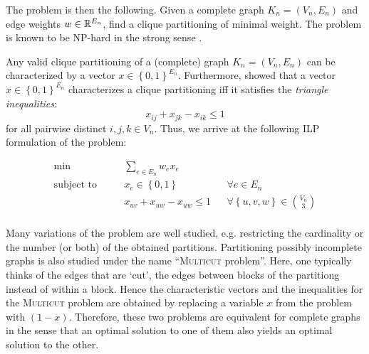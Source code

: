 The \CP problem is then the following.
Given a complete graph $K_n=(V_n,E_n)$ and edge weights $w \in \mathbb{R}^{E_n}$, find a clique partitioning of minimal weight.
The problem is known to be \textsc{NP}-hard in the strong sense \cite{wakabayashiAggregationBinaryRelations1986}.

Any valid clique partitioning of a (complete) graph $K_{n}=(V_{n}, E_{n})$ can be characterized by a vector $x \in \left\{ 0,1 \right\}^{E_{n}}$.
Furthermore, \cite{grotschelFacetsCliquePartitioning1990} showed that a vector $x \in \left\{ 0,1 \right\}^{E_{n}}$ characterizes a clique partitioning iff it satisfies the \textit{triangle inequalities}:
\[
	 x_{ij} + x_{jk} - x_{ik} \leq 1
\]
for all pairwise distinct $i,j,k \in V_{n}$.
Thus, we arrive at the following ILP formulation of the \CP problem:

\begin{align*}
	\min && &\sum_{e \in E_{n}} w_{e} x_{e} \\[1.5ex]
	\text{subject to } && &x_{e} \in \left\{ 0,1 \right\} && \forall e \in E_{n} \\
					   && &x_{uv} + x_{uw} - x_{uw} \leq 1 && \forall \left\{ u,v,w \right\} \in \binom{V_{n}}{3} \\
\end{align*}

Many variations of the problem are well studied, e.g. restricting the cardinality or the number (or both) of the obtained partitions.
Partitioning possibly incomplete graphs is also studied under the name “\textsc{Multicut} problem”.
Here, one typically thinks of the edges that are ‘cut’, \ie the edges between blocks of the partitiong instead of within a block.
Hence the characteristic vectors and the inequalities for the \textsc{Multicut} problem are obtained by replacing a variable $x$ from the \CP problem with $(1-x)$.
Therefore, these two problems are equivalent for complete graphs in the sense that an optimal solution to one of them also yields an optimal solution to the other.
